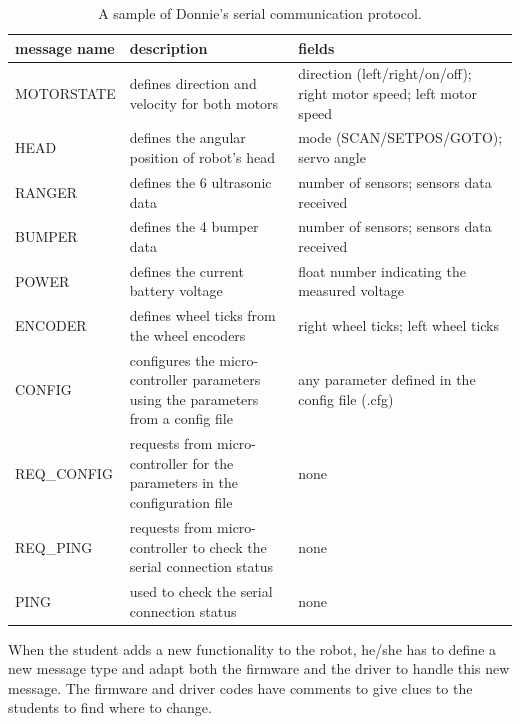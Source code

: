 \begin{table}[h]
  \caption{A sample of Donnie's serial communication protocol.}
  \label{tab:serial-protocol}
\begin{center}
  \begin{tabular}{ p{1.6cm} | p{3cm} | p{2.6cm} }
    \bf{message name} & \bf{description} & \bf{fields}\\
    \hline
    MOTORSTATE & defines direction and velocity for both motors & direction (left/right/on/off); right motor speed; left motor speed   \\
    \hline
    HEAD & defines the angular position of robot's head & mode (SCAN/SETPOS/GOTO); servo angle\\
    \hline
    RANGER & defines the 6 ultrasonic data & number of sensors; sensors data received \\
    \hline
    BUMPER & defines the 4 bumper data & number of sensors; sensors data received \\
    \hline
    POWER & defines the current battery voltage & float number indicating the measured voltage \\
    \hline
    ENCODER & defines wheel ticks from the wheel encoders & right wheel ticks; left wheel ticks \\
    \hline
    CONFIG & configures the micro-controller parameters using the parameters from a config file & any parameter defined in the config file (.cfg) \\
    \hline
    REQ\_CONFIG & requests from micro-controller for the parameters in the configuration file & none \\
    \hline
    REQ\_PING & requests from micro-controller to check the serial connection status & none \\
    \hline
    PING & used to check the serial connection status & none \\
    \hline
  \end{tabular}
\end{center}
\end{table}

When the student adds a new functionality to the robot, he/she has to define a new message type and adapt both the firmware and the driver to handle this new message.
The firmware and driver codes have comments to give clues to the students to find where to change.

